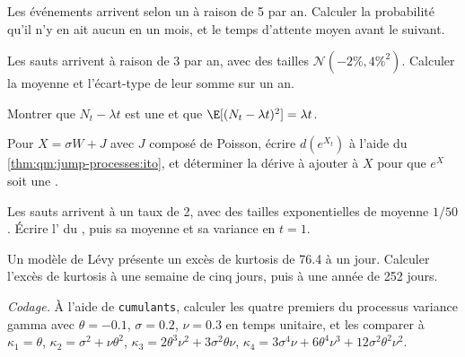 \begin{exercise}[$\star$]\label{exo:qm:jump-processes:1}
Les événements arrivent selon un  à raison de 5 par an. Calculer la probabilité qu'il n'y en ait aucun en un mois, et le
temps d'attente moyen avant le suivant.
\end{exercise}

\begin{exercise}[$\star$]\label{exo:qm:jump-processes:2}
Les sauts arrivent à raison de 3 par an, avec des tailles $\mathcal N(-2\%, 4\%^2)$. Calculer la moyenne et l'écart-type de
leur somme sur un an.
\end{exercise}

\begin{exercise}[$\star$]\label{exo:qm:jump-processes:3}
Montrer que $N_t - \lambda t$ est une  et que $\E[(N_t - \lambda t)^2] = \lambda t$.
\end{exercise}

\begin{exercise}[$\star\star$]\label{exo:qm:jump-processes:4}
Pour $X = \sigma W + J$ avec $J$ composé de Poisson, écrire $d(e^{X_t})$ à l'aide du \cref{thm:qm:jump-processes:ito}, et
déterminer la dérive à ajouter à $X$ pour que $e^X$ soit une .
\end{exercise}

\begin{exercise}[$\star\star$]\label{exo:qm:jump-processes:5}
Les sauts arrivent à un taux de 2, avec des tailles exponentielles de moyenne $1/50$. Écrire l' du
, puis sa moyenne et sa variance en $t = 1$.
\end{exercise}

\begin{exercise}[$\star\star$]\label{exo:qm:jump-processes:6}
Un modèle de Lévy présente un excès de kurtosis de 76.4 à un jour. Calculer l'excès de kurtosis à une semaine de cinq jours, puis
à une année de 252 jours.
\end{exercise}

\begin{exercise}[$\star\star\star$]\label{exo:qm:jump-processes:7}
\emph{Codage.} À l'aide de \texttt{cumulants}, calculer les quatre premiers  du processus variance gamma
avec $\theta = -0.1$, $\sigma = 0.2$, $\nu = 0.3$ en temps unitaire, et les comparer à $\kappa_1 = \theta$, $\kappa_2 = \sigma^2 +
\nu\theta^2$, $\kappa_3 = 2\theta^3\nu^2 + 3\sigma^2\theta\nu$, $\kappa_4 = 3\sigma^4\nu + 6\theta^4\nu^3 + 12\sigma^2\theta^2\nu^2$.
\end{exercise}

